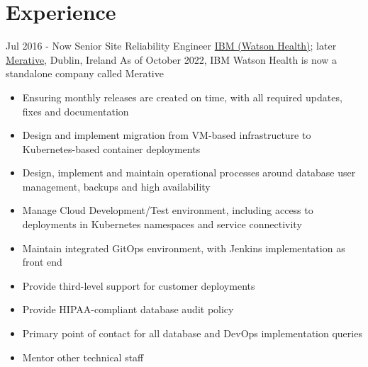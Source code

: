 \documentclass[a4paper]{tenseconds} %
\begin{document}
\section{Experience}
\begin{twenty} %
	\twentyitem
	{Jul 2016 -}
	{Now}
	{Senior Site Reliability Engineer}
	{\href{https://www.ibm.com/watson-health}{IBM (Watson Health)}; later \href{https://merative.com}{Merative}, Dublin, Ireland}
	{As of October 2022, IBM Watson Health is now a standalone company called Merative }
	{
		\begin{itemize}
			\item Ensuring monthly releases are created on time, with all required updates, fixes and documentation
			\item Design and implement migration from VM-based infrastructure to Kubernetes-based container deployments
			\item Design, implement and maintain operational processes around database user management, backups and high availability
			\item Manage Cloud Development/Test environment, including access to deployments in Kubernetes namespaces and service connectivity
			\item Maintain integrated GitOps environment, with Jenkins implementation as front end
			\item Provide third-level support for customer deployments
			\item Provide HIPAA-compliant database audit policy
			\item Primary point of contact for all database and DevOps implementation queries
			\item Mentor other technical staff
		\end{itemize}
}
\end{twenty}
\end{document}
